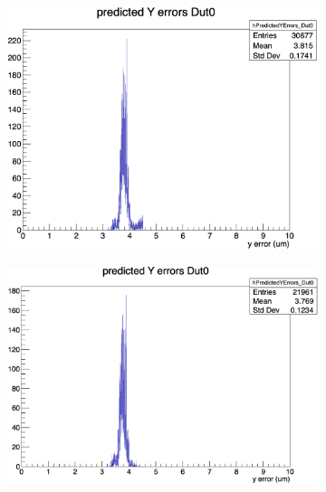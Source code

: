 \begin{figure}[H]
    \begin{subfigure}[b]{0.3\textwidth}
        \includegraphics[width=\textwidth]{images/YPredicError_13planes.png}
        \caption{}
    \end{subfigure}
    \hfill
    \begin{subfigure}[b]{0.33\textwidth}
        \includegraphics[width=\textwidth]{images/YPredError_4pixel.png}
        \caption{}
    \end{subfigure}
    \hfill
    \begin{subfigure}[b]{0.3\textwidth}

\end{subfigure}
\end{figure}
